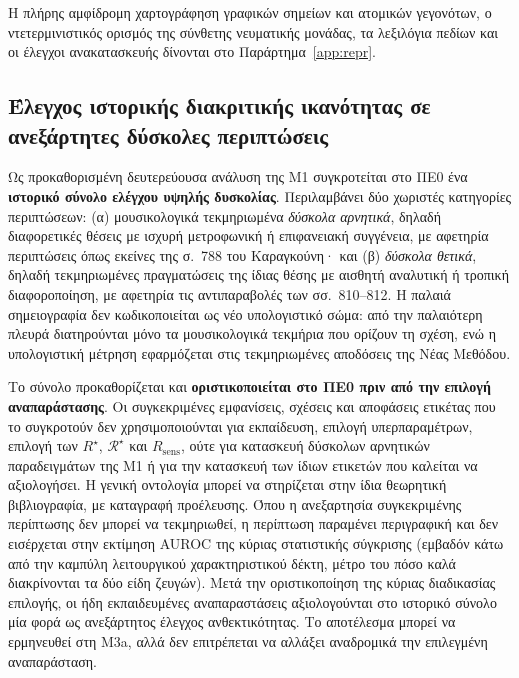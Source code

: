 \documentclass[11pt,a4paper]{article}
\begin{document}
Η πλήρης αμφίδρομη χαρτογράφηση γραφικών σημείων και ατομικών γεγονότων, ο ντετερμινιστικός ορισμός της σύνθετης νευματικής μονάδας, τα λεξιλόγια πεδίων και οι έλεγχοι ανακατασκευής δίνονται στο Παράρτημα~\ref{app:repr}.

\subsection{Έλεγχος ιστορικής διακριτικής ικανότητας σε ανεξάρτητες δύσκολες περιπτώσεις}\label{sec:hist-discriminability}

Ως προκαθορισμένη δευτερεύουσα ανάλυση της M1 συγκροτείται στο ΠΕ0 ένα \textbf{ιστορικό σύνολο ελέγχου υψηλής δυσκολίας}. Περιλαμβάνει δύο χωριστές κατηγορίες περιπτώσεων: (α) μουσικολογικά τεκμηριωμένα \emph{δύσκολα αρνητικά}, δηλαδή διαφορετικές θέσεις με ισχυρή μετροφωνική ή επιφανειακή συγγένεια, με αφετηρία περιπτώσεις όπως εκείνες της σ.~788 του Καραγκούνη· και (β) \emph{δύσκολα θετικά}, δηλαδή τεκμηριωμένες πραγματώσεις της ίδιας θέσης με αισθητή αναλυτική ή τροπική διαφοροποίηση, με αφετηρία τις αντιπαραβολές των σσ.~810--812. Η παλαιά σημειογραφία δεν κωδικοποιείται ως νέο υπολογιστικό σώμα: από την παλαιότερη πλευρά διατηρούνται μόνο τα μουσικολογικά τεκμήρια που ορίζουν τη σχέση, ενώ η υπολογιστική μέτρηση εφαρμόζεται στις τεκμηριωμένες αποδόσεις της Νέας Μεθόδου.

Το σύνολο προκαθορίζεται και \textbf{οριστικοποιείται στο ΠΕ0 πριν από την επιλογή αναπαράστασης}. Οι συγκεκριμένες εμφανίσεις, σχέσεις και αποφάσεις ετικέτας που το συγκροτούν δεν χρησιμοποιούνται για εκπαίδευση, επιλογή υπερπαραμέτρων, επιλογή των $R^\star$, $\mathcal R^\star$ και $R_{\mathrm{sens}}$, ούτε για κατασκευή δύσκολων αρνητικών παραδειγμάτων της M1 ή για την κατασκευή των ίδιων ετικετών που καλείται να αξιολογήσει. Η γενική οντολογία μπορεί να στηρίζεται στην ίδια θεωρητική βιβλιογραφία, με καταγραφή προέλευσης. Όπου η ανεξαρτησία συγκεκριμένης περίπτωσης δεν μπορεί να τεκμηριωθεί, η περίπτωση παραμένει περιγραφική και δεν εισέρχεται στην εκτίμηση AUROC της κύριας στατιστικής σύγκρισης (εμβαδόν κάτω από την καμπύλη λειτουργικού χαρακτηριστικού δέκτη, μέτρο του πόσο καλά διακρίνονται τα δύο είδη ζευγών). Μετά την οριστικοποίηση της κύριας διαδικασίας επιλογής, οι ήδη εκπαιδευμένες αναπαραστάσεις αξιολογούνται στο ιστορικό σύνολο μία φορά ως ανεξάρτητος έλεγχος ανθεκτικότητας. Το αποτέλεσμα μπορεί να ερμηνευθεί στη M3a, αλλά δεν επιτρέπεται να αλλάξει αναδρομικά την επιλεγμένη αναπαράσταση.
\end{document}
